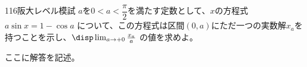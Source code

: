 \begin{thm}{116}{}{阪大レベル模試}
 $a$を$0<a<\dfrac{\pi}{2}$を満たす定数として、$x$の方程式 $a\sin x = 1-\cos a$ について、この方程式は区間$(0,a)$にただ一つの実数解$x_a$を持つことを示し、$\disp \lim_{a\to +0} \frac{x_a}{a}$ の値を求めよ。
\end{thm}

ここに解答を記述。